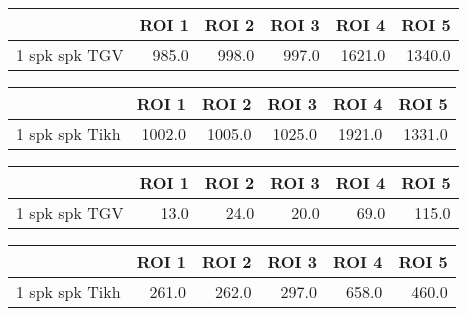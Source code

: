 \begin{tabular}{lrrrrr}
\toprule
{} &  ROI 1 &  ROI 2 &  ROI 3 &   ROI 4 &   ROI 5 \\
\midrule
1 spk spk TGV &  985.0 &  998.0 &  997.0 &  1621.0 &  1340.0 \\
\bottomrule
\end{tabular}
\begin{tabular}{lrrrrr}
\toprule
{} &   ROI 1 &   ROI 2 &   ROI 3 &   ROI 4 &   ROI 5 \\
\midrule
1 spk spk Tikh &  1002.0 &  1005.0 &  1025.0 &  1921.0 &  1331.0 \\
\bottomrule
\end{tabular}
\begin{tabular}{lrrrrr}
\toprule
{} &  ROI 1 &  ROI 2 &  ROI 3 &  ROI 4 &  ROI 5 \\
\midrule
1 spk spk TGV &   13.0 &   24.0 &   20.0 &   69.0 &  115.0 \\
\bottomrule
\end{tabular}
\begin{tabular}{lrrrrr}
\toprule
{} &  ROI 1 &  ROI 2 &  ROI 3 &  ROI 4 &  ROI 5 \\
\midrule
1 spk spk Tikh &  261.0 &  262.0 &  297.0 &  658.0 &  460.0 \\
\bottomrule
\end{tabular}
